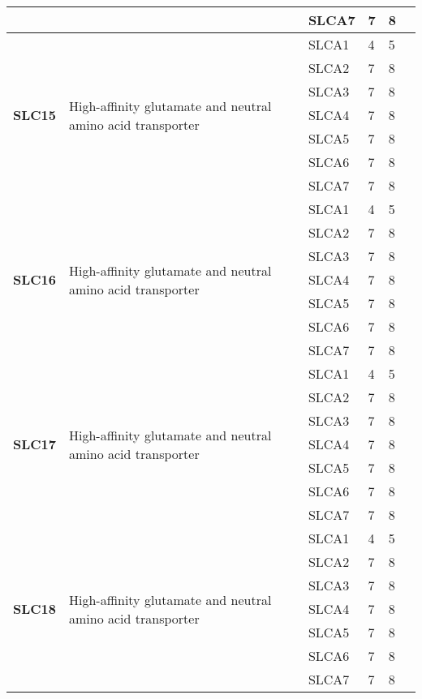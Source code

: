 \documentclass[12pt]{report}
\begin{document}
\begin{center}
\begin{longtable}{|p{1.5cm}|p{3.2cm}|p{1.9cm}|p{1.65cm}|p{3cm}|p{3cm}|}
\cline{3-6}
&&SLCA7&7 & 8&\\ 
\hline
\multirow{7}{1.5cm}{\textbf{SLC15}} & \multirow{7}{4cm}{High-affinity glutamate and neutral amino acid transporter} & SLCA1 & 4 & 5\\ 
\cline{3-6}
&&SLCA2&7 & 8&\\ 
\cline{3-6}
&&SLCA3&7 & 8&\\ 
\cline{3-6}
&&SLCA4&7 & 8&\\ 
\cline{3-6}
&&SLCA5&7 & 8&\\ 
\cline{3-6}
&&SLCA6&7 & 8&\\ 
\cline{3-6}
&&SLCA7&7 & 8&\\ 
\hline
\multirow{7}{1.5cm}{\textbf{SLC16}} & \multirow{7}{4cm}{High-affinity glutamate and neutral amino acid transporter} & SLCA1 & 4 & 5\\ 
\cline{3-6}
&&SLCA2&7 & 8&\\ 
\cline{3-6}
&&SLCA3&7 & 8&\\ 
\cline{3-6}
&&SLCA4&7 & 8&\\ 
\cline{3-6}
&&SLCA5&7 & 8&\\ 
\cline{3-6}
&&SLCA6&7 & 8&\\ 
\cline{3-6}
&&SLCA7&7 & 8&\\ 
\hline
\multirow{7}{1.5cm}{\textbf{SLC17}} & \multirow{7}{4cm}{High-affinity glutamate and neutral amino acid transporter} & SLCA1 & 4 & 5\\ 
\cline{3-6}
&&SLCA2&7 & 8&\\ 
\cline{3-6}
&&SLCA3&7 & 8&\\ 
\cline{3-6}
&&SLCA4&7 & 8&\\ 
\cline{3-6}
&&SLCA5&7 & 8&\\ 
\cline{3-6}
&&SLCA6&7 & 8&\\ 
\cline{3-6}
&&SLCA7&7 & 8&\\ 
\hline
\multirow{7}{1.5cm}{\textbf{SLC18}} & \multirow{7}{4cm}{High-affinity glutamate and neutral amino acid transporter} & SLCA1 & 4 & 5\\ 
\cline{3-6}
&&SLCA2&7 & 8&\\ 
\cline{3-6}
&&SLCA3&7 & 8&\\ 
\cline{3-6}
&&SLCA4&7 & 8&\\ 
\cline{3-6}
&&SLCA5&7 & 8&\\ 
\cline{3-6}
&&SLCA6&7 & 8&\\ 
\cline{3-6}
&&SLCA7&7 & 8&\\ 
\hline

\end{longtable}
\end{center}
\end{document}
